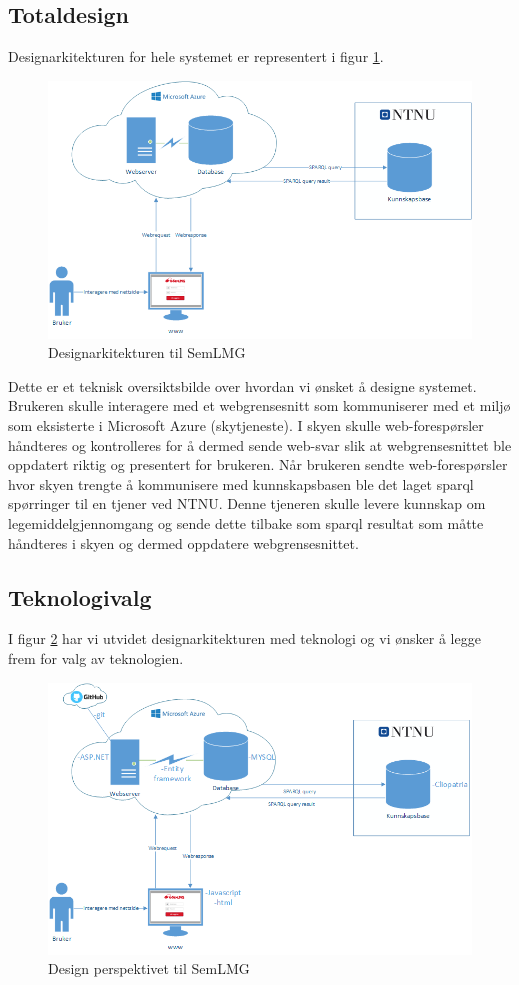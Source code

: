 \subsection{Totaldesign}
Designarkitekturen for hele systemet er representert i figur \ref{fig:designview}.
\begin{figure}[H]
\centering
\includegraphics[width=14cm]{images/designview.png}
\caption{Designarkitekturen til SemLMG}
\label{fig:designview}
\end{figure}
Dette er et teknisk oversiktsbilde over hvordan vi ønsket å designe systemet. Brukeren skulle interagere med et webgrensesnitt som kommuniserer med et miljø som eksisterte i Microsoft Azure (skytjeneste). I skyen skulle web-forespørsler håndteres og kontrolleres for å dermed sende web-svar slik at webgrensesnittet ble oppdatert riktig og presentert for brukeren. Når brukeren sendte web-forespørsler hvor skyen trengte å kommunisere med kunnskapsbasen ble det laget \gls{sparql} spørringer til en tjener ved NTNU. Denne tjeneren skulle levere kunnskap om legemiddelgjennomgang og sende dette tilbake som \gls{sparql} resultat som måtte håndteres i skyen og dermed oppdatere webgrensesnittet.
\subsection{Teknologivalg}
I figur \ref{fig:designviewmedteknologi} har vi utvidet designarkitekturen med teknologi og vi ønsker å legge frem for valg av teknologien.
\begin{figure}[H]
\centering
\includegraphics[width=14cm]{images/DesignViewMedTeknologi.png}
\caption{Design perspektivet til SemLMG}
\label{fig:designviewmedteknologi}
\end{figure}
